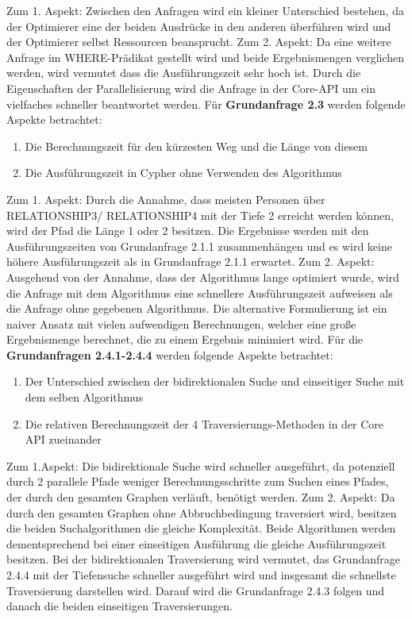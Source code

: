 Zum 1. Aspekt: Zwischen den Anfragen wird ein kleiner Unterschied bestehen, da der Optimierer eine der beiden Ausdrücke in den anderen überführen wird und der Optimierer selbst Ressourcen beansprucht. \newline
Zum 2. Aspekt: Da eine weitere Anfrage im WHERE-Prädikat gestellt wird und beide Ergebnismengen verglichen werden, wird vermutet dass die Ausführungszeit sehr hoch ist. Durch die Eigenschaften der Parallelisierung wird die Anfrage in der Core-API um ein vielfaches schneller beantwortet werden. \newline  \newline
Für \textbf{Grundanfrage 2.3} werden folgende Aspekte betrachtet: 
\begin{enumerate}
	\item Die Berechnungszeit für den kürzesten Weg und die Länge von diesem
	\item Die Ausführungszeit in Cypher ohne Verwenden des Algorithmus
\end{enumerate}
Zum 1. Aspekt: Durch die Annahme, dass meisten Personen über RELATIONSHIP3/ RELATIONSHIP4 mit der Tiefe 2 erreicht werden können, wird  der Pfad die Länge 1 oder 2 besitzen. Die Ergebnisse werden mit den Ausführungszeiten von Grundanfrage 2.1.1 zusammenhängen und es wird keine höhere Ausführungszeit als in Grundanfrage 2.1.1 erwartet. \newline
Zum 2. Aspekt: Ausgehend von der Annahme, dass der Algorithmus lange optimiert wurde, wird die Anfrage mit dem Algorithmus eine schnellere Ausführungszeit aufweisen als die Anfrage ohne gegebenen Algorithmus. Die alternative Formulierung ist ein naiver Ansatz mit vielen aufwendigen Berechnungen, welcher eine große Ergebnismenge berechnet, die zu einem Ergebnis minimiert wird. \newline \newline
Für die \textbf{Grundanfragen 2.4.1-2.4.4} werden folgende Aspekte betrachtet:
\begin{enumerate}
	\item Der Unterschied zwischen der bidirektionalen Suche und einseitiger Suche mit dem selben Algorithmus
	\item Die relativen Berechnungszeit der 4 Traversierungs-Methoden in der Core API zueinander
\end{enumerate}
Zum 1.Aspekt: Die bidirektionale Suche wird schneller ausgeführt, da potenziell durch 2 parallele Pfade  weniger Berechnungsschritte zum Suchen eines Pfades, der  durch den gesamten Graphen verläuft, benötigt werden. \newline 
Zum 2. Aspekt: Da durch den gesamten Graphen ohne Abbruchbedingung traversiert wird, besitzen die beiden Suchalgorithmen die gleiche Komplexität. Beide Algorithmen werden dementsprechend bei einer einseitigen Ausführung die gleiche Ausführungszeit besitzen. Bei der bidirektionalen Traversierung wird vermutet, das Grundanfrage 2.4.4 mit der Tiefensuche schneller ausgeführt wird und insgesamt die schnellste Traversierung darstellen wird. Darauf wird die Grundanfrage 2.4.3 folgen und danach die beiden einseitigen Traversierungen. 
